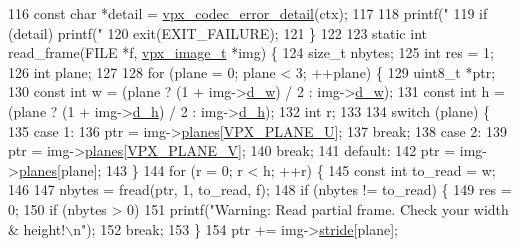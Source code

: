\begin{DoxyCodeInclude}
{116   \textcolor{keyword}{const} \textcolor{keywordtype}{char} *detail = \hyperlink{group__codec_ga29273cb552ed1a437fe263c4a0a54300}{vpx\_codec\_error\_detail}(ctx);
117 
118   printf(\textcolor{stringliteral}{"%
119   \textcolor{keywordflow}{if} (detail) printf(\textcolor{stringliteral}{"    %
120   exit(EXIT\_FAILURE);
121 \}
122 
123 \textcolor{keyword}{static} \textcolor{keywordtype}{int} read\_frame(FILE *f, \hyperlink{structvpx__image}{vpx\_image\_t} *img) \{
124   \textcolor{keywordtype}{size\_t} nbytes;
125   \textcolor{keywordtype}{int} res = 1;
126   \textcolor{keywordtype}{int} plane;
127 
128   \textcolor{keywordflow}{for} (plane = 0; plane < 3; ++plane) \{
129     uint8\_t *ptr;
130     \textcolor{keyword}{const} \textcolor{keywordtype}{int} w = (plane ? (1 + img->\hyperlink{structvpx__image_a806bf23143bf00a0b3fdbd6ba030c483}{d\_w}) / 2 : img->\hyperlink{structvpx__image_a806bf23143bf00a0b3fdbd6ba030c483}{d\_w});
131     \textcolor{keyword}{const} \textcolor{keywordtype}{int} h = (plane ? (1 + img->\hyperlink{structvpx__image_a31bc5f045d4f3c2b6bb0f57bb53078e7}{d\_h}) / 2 : img->\hyperlink{structvpx__image_a31bc5f045d4f3c2b6bb0f57bb53078e7}{d\_h});
132     \textcolor{keywordtype}{int} r;
133 
134     \textcolor{keywordflow}{switch} (plane) \{
135       \textcolor{keywordflow}{case} 1:
136         ptr = img->\hyperlink{structvpx__image_ab6258308ba7a5f4a113348120e20e2ce}{planes}[\hyperlink{vpx__image_8h_a4770fc8fa60021a2229f25553152cf81}{VPX\_PLANE\_U}];
137         \textcolor{keywordflow}{break};
138       \textcolor{keywordflow}{case} 2:
139         ptr = img->\hyperlink{structvpx__image_ab6258308ba7a5f4a113348120e20e2ce}{planes}[\hyperlink{vpx__image_8h_aca9436ec761457cc6d2e356e0ac2fd23}{VPX\_PLANE\_V}];
140         \textcolor{keywordflow}{break};
141       \textcolor{keywordflow}{default}:
142         ptr = img->\hyperlink{structvpx__image_ab6258308ba7a5f4a113348120e20e2ce}{planes}[plane];
143     \}
144     \textcolor{keywordflow}{for} (r = 0; r < h; ++r) \{
145       \textcolor{keyword}{const} \textcolor{keywordtype}{int} to\_read = w;
146 
147       nbytes = fread(ptr, 1, to\_read, f);
148       \textcolor{keywordflow}{if} (nbytes != to\_read) \{
149         res = 0;
150         \textcolor{keywordflow}{if} (nbytes > 0)
151           printf(\textcolor{stringliteral}{"Warning: Read partial frame. Check your width & height!\(\backslash\)n"});
152         \textcolor{keywordflow}{break};
153       \}
154       ptr += img->\hyperlink{structvpx__image_ac9c7b83e3eea44cb680956f90dc789cf}{stride}[plane];
}}}
\end{DoxyCodeInclude}
